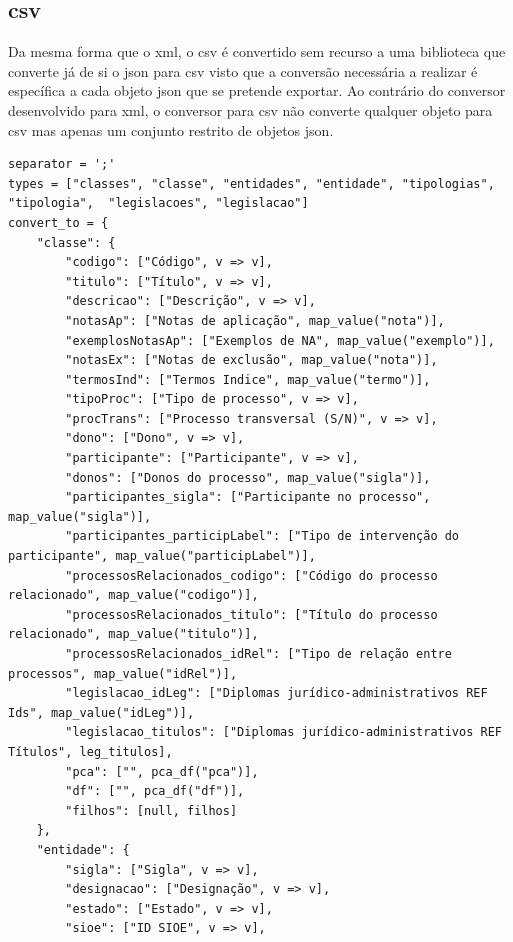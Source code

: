 \subsection{\acrshort{csv}}

Da mesma forma que o \acrshort{xml}, o \acrshort{csv} é convertido sem recurso a uma biblioteca que converte já de si o \acrshort{json} para \acrshort{csv} visto que a conversão necessária a realizar é específica a cada objeto \acrshort{json} que se pretende exportar. Ao contrário do conversor desenvolvido para \acrshort{xml}, o conversor para \acrshort{csv} não converte qualquer objeto para \acrshort{csv} mas apenas um conjunto restrito de objetos \acrshort{json}.

\begin{lstlisting}[language=pseudocode, caption=Algorítmo de conversão de \acrshort{json} para \acrshort{csv}]
separator = ';'
types = ["classes", "classe", "entidades", "entidade", "tipologias", "tipologia",  "legislacoes", "legislacao"]
convert_to = {
    "classe": {
        "codigo": ["Código", v => v],
        "titulo": ["Título", v => v],
        "descricao": ["Descrição", v => v],
        "notasAp": ["Notas de aplicação", map_value("nota")],
        "exemplosNotasAp": ["Exemplos de NA", map_value("exemplo")],
        "notasEx": ["Notas de exclusão", map_value("nota")],
        "termosInd": ["Termos Indice", map_value("termo")],
        "tipoProc": ["Tipo de processo", v => v],
        "procTrans": ["Processo transversal (S/N)", v => v],
        "dono": ["Dono", v => v],
        "participante": ["Participante", v => v],
        "donos": ["Donos do processo", map_value("sigla")],
        "participantes_sigla": ["Participante no processo", map_value("sigla")],
        "participantes_participLabel": ["Tipo de intervenção do participante", map_value("participLabel")],
        "processosRelacionados_codigo": ["Código do processo relacionado", map_value("codigo")],
        "processosRelacionados_titulo": ["Título do processo relacionado", map_value("titulo")],
        "processosRelacionados_idRel": ["Tipo de relação entre processos", map_value("idRel")],
        "legislacao_idLeg": ["Diplomas jurídico-administrativos REF Ids", map_value("idLeg")],
        "legislacao_titulos": ["Diplomas jurídico-administrativos REF Títulos", leg_titulos],
        "pca": ["", pca_df("pca")],
        "df": ["", pca_df("df")],
        "filhos": [null, filhos]
    },
    "entidade": {
        "sigla": ["Sigla", v => v],
        "designacao": ["Designação", v => v],
        "estado": ["Estado", v => v],
        "sioe": ["ID SIOE", v => v],

\end{lstlisting}
